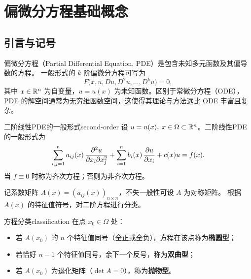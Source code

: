 \documentclass[11pt,a4paper,openany,oneside]{ctexbook}
\begin{document}
\renewcommand{\NCWUtitle}{偏微分方程}
\renewcommand{\NCWUtitleEnglish}{Partial Differential Equations}
\renewcommand{\NCWUdocumentType}{讲\qquad 义}
\renewcommand{\NCWUcourseType}{数学专业\quad 研究生课程讲义}
\renewcommand{\NCWUauthor}{杨建伟}
\renewcommand{\NCWUuniversity}{华北水利水电大学}
\renewcommand{\NCWUschool}{数学与统计学院}
\renewcommand{\NCWUschoolEnglish}{School of Mathematics and Statistics}
\renewcommand{\NCWUdate}{\today}
\renewcommand{\NCWUdescription}{本讲义面向数学专业硕士研究生，系统讲授偏微分方程的基本理论与方法。内容涵盖一阶方程、波动方程、热传导方程、位势方程四大经典主题，注重理论的严谨性与方法的实用性。}
\renewcommand{\NCWUcourseInfo}{偏微分方程（48--64学时）}
\renewcommand{\NCWUaudience}{数学、统计及相关专业硕士研究生}

\makeNCWUfrontmatter

\chapter{偏微分方程基础概念}

\section{引言与记号}

偏微分方程（Partial Differential Equation, PDE）是包含未知多元函数及其偏导数的方程。
一般形式的 $k$ 阶偏微分方程可写为
$$
F\bigl(x, u, Du, D^{2}u, \dots, D^{k}u\bigr) = 0,
$$
其中 $x\in\mathbb{R}^{n}$ 为自变量，$u=u(x)$ 为未知函数。区别于常微分方程（ODE），
PDE 的解空间通常为无穷维函数空间，这使得其理论与方法远比 ODE 丰富且复杂。

\begin{definition}{二阶线性PDE的一般形式}{second-order}
  设 $u=u(x),\; x\in\Omega\subset\mathbb{R}^{n}$。二阶线性PDE的一般形式为
  $$
  \sum_{i,j=1}^{n} a_{ij}(x)\,\frac{\partial^2 u}{\partial x_{i}\partial x_{j}^2}
    + \sum_{i=1}^{n} b_{i}(x)\,\frac{\partial u}{\partial x_{i}} + c(x)u = f(x).
  $$
  当 $f\equiv 0$ 时称为齐次方程；否则为非齐次方程。
\end{definition}

记系数矩阵 $A(x) = (a_{ij}(x))_{n\times n}$，不失一般性可设 $A$ 为对称矩阵。
根据 $A(x)$ 的特征值符号，对二阶方程进行分类。

\begin{definition}{方程分类}{classification}
  在点 $x_{0}\in\Omega$ 处：
  \begin{itemize}
    \item 若 $A(x_{0})$ 的 $n$ 个特征值同号（全正或全负），方程在该点称为\textbf{椭圆型}；
    \item 若恰好 $n-1$ 个特征值同号，余下一个反号，称为\textbf{双曲型}；
    \item 若 $A(x_{0})$ 为退化矩阵（$\det A=0$），称为\textbf{抛物型}。
  \end{itemize}
\end{definition}
\end{document}
